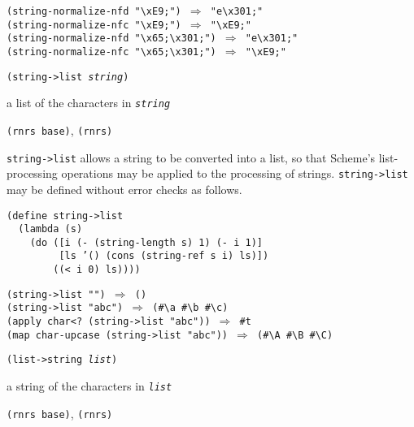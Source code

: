 \begin{alltt}
(string-normalize-nfd "\textbackslash{}xE9;") \(\Rightarrow\) "e\textbackslash{}x301;"
(string-normalize-nfc "\textbackslash{}xE9;") \(\Rightarrow\) "\textbackslash{}xE9;"
(string-normalize-nfd "\textbackslash{}x65;\textbackslash{}x301;") \(\Rightarrow\) "e\textbackslash{}x301;"
(string-normalize-nfc "\textbackslash{}x65;\textbackslash{}x301;") \(\Rightarrow\) "\textbackslash{}xE9;"
\end{alltt}

\begin{description}

\label{objects_s228}\item[procedure] \texttt{(string-\textgreater{}list \textit{string})}



\item[returns] a list of the characters in \texttt{\textit{string}}


\item[libraries] \texttt{(rnrs base)}, \texttt{(rnrs)}
\end{description}

\texttt{string-\textgreater{}list} allows a string to be converted into a list, so that
Scheme's list-processing operations may be applied to the processing of
strings.
\texttt{string-\textgreater{}list} may be defined without error checks as follows.

\begin{alltt}
(define string-\textgreater{}list
  (lambda (s)
    (do ([i (- (string-length s) 1) (- i 1)]
         [ls '() (cons (string-ref s i) ls)])
        ((\textless{} i 0) ls))))

(string-\textgreater{}list "") \(\Rightarrow\) ()
(string-\textgreater{}list "abc") \(\Rightarrow\) (\#{}\textbackslash{}a \#{}\textbackslash{}b \#{}\textbackslash{}c)
(apply char\textless{}? (string-\textgreater{}list "abc")) \(\Rightarrow\) \#{}t
(map char-upcase (string-\textgreater{}list "abc")) \(\Rightarrow\) (\#{}\textbackslash{}A \#{}\textbackslash{}B \#{}\textbackslash{}C)
\end{alltt}

\begin{description}

\label{objects_s229}\item[procedure] \texttt{(list-\textgreater{}string \textit{list})}



\item[returns] a string of the characters in \texttt{\textit{list}}


\item[libraries] \texttt{(rnrs base)}, \texttt{(rnrs)}
\end{description}

